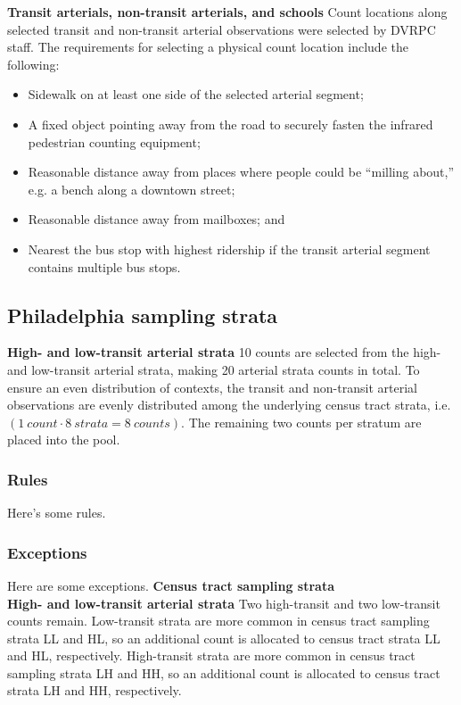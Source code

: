 \documentclass[paper=letterpaper, fontsize=11pt]{scrartcl}
\begin{document}
\textbf{Transit arterials, non-transit arterials, and schools} Count locations along selected transit and non-transit arterial observations were selected by DVRPC staff. The requirements for selecting a physical count location include the following:
\begin{itemize}[itemsep=-4pt]
	\item Sidewalk on at least one side of the selected arterial segment;
	\item A fixed object pointing away from the road to securely fasten the infrared pedestrian counting equipment;
	\item Reasonable distance away from places where people could be ``milling about,'' e.g. a bench along a downtown street;
	\item Reasonable distance away from mailboxes; and
	\item Nearest the bus stop with highest ridership if the transit arterial segment contains multiple bus stops.
\end{itemize}

\subsection{Philadelphia sampling strata}
\textbf{High- and low-transit arterial strata} 10 counts are selected from the high- and low-transit arterial strata, making 20 arterial strata counts in total. To ensure an even distribution of contexts, the transit and non-transit arterial observations are evenly distributed among the underlying census tract strata, i.e. $\left(1\:count \cdot 8\: strata = 8 \: counts\right)$. The remaining two counts per stratum are placed into the pool. \\

\subsubsection{Rules}
Here's some rules.

\subsubsection{Exceptions}
Here are some exceptions. \textbf{Census tract sampling strata} \\

\textbf{High- and low-transit arterial strata} Two high-transit and two low-transit counts remain. Low-transit strata are more common in census tract sampling strata LL and HL, so an additional count is allocated to census tract strata LL and HL, respectively. High-transit strata are more common in census tract sampling strata LH and HH, so an additional count is allocated to census tract strata LH and HH, respectively. \\
\end{document}

